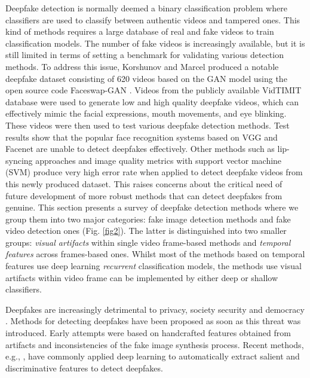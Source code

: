 \label{sec:3}
Deepfake detection is normally deemed a binary classification problem where classifiers are used to classify between authentic videos and tampered ones. This kind of methods requires a large database of real and fake videos to train classification models. The number of fake videos is increasingly available, but it is still limited in terms of setting a benchmark for validating various detection methods. To address this issue, Korshunov and Marcel  produced a notable deepfake dataset consisting of 620 videos based on the GAN model using the open source code Faceswap-GAN . Videos from the publicly available VidTIMIT database  were used to generate low and high quality deepfake videos, which can effectively mimic the facial expressions, mouth movements, and eye blinking. These videos were then used to test various deepfake detection methods. Test results show that the popular face recognition systems based on VGG  and Facenet  are unable to detect deepfakes effectively. Other methods such as lip-syncing approaches  and image quality metrics with support vector machine (SVM)  produce very high error rate when applied to detect deepfake videos from this newly produced dataset. This raises concerns about the critical need of future development of more robust methods that can detect deepfakes from genuine.
This section presents a survey of deepfake detection methods where we group them into two major categories: fake image detection methods and fake video detection ones (Fig. \ref{fig2}). The latter is distinguished into two smaller groups: \emph{visual artifacts} within single video frame-based methods and \emph{temporal features} across frames-based ones. Whilst most of the methods based on temporal features use deep learning \emph{recurrent} classification models, the methods use visual artifacts within video frame can be implemented by either deep or shallow classifiers.

Deepfakes are increasingly detrimental to privacy, society security and democracy . Methods for detecting deepfakes have been proposed as soon as this threat was introduced. Early attempts were based on handcrafted features obtained from artifacts and inconsistencies of the fake image synthesis process. Recent methods, e.g., , have commonly applied deep learning to automatically extract salient and discriminative features to detect deepfakes.

